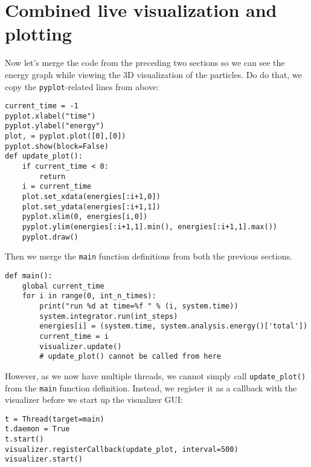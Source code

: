 \documentclass[
paper=a4,                       %
fontsize=11pt,                  %
twoside,                        %
footsepline,                    %
headsepline,                    %
headinclude=false,              %
footinclude=false,              %
pagesize,                       %
]{scrartcl}
\begin{document}
\section{Combined live visualization and plotting}

Now let's merge the code from the preceding two sections so we can see the energy graph while viewing the 3D visualization of the particles.
Do do that, we copy the \lstinline{pyplot}-related lines from above:
\begin{lstlisting}
current_time = -1
pyplot.xlabel("time")
pyplot.ylabel("energy")
plot, = pyplot.plot([0],[0])
pyplot.show(block=False)
def update_plot():
    if current_time < 0:
        return
    i = current_time
    plot.set_xdata(energies[:i+1,0])
    plot.set_ydata(energies[:i+1,1])
    pyplot.xlim(0, energies[i,0])
    pyplot.ylim(energies[:i+1,1].min(), energies[:i+1,1].max())
    pyplot.draw()
\end{lstlisting}
Then we merge the \lstinline{main} function definitions from both the previous sections.
\begin{lstlisting}
def main():
    global current_time
    for i in range(0, int_n_times):
        print("run %d at time=%f " % (i, system.time))
        system.integrator.run(int_steps)
        energies[i] = (system.time, system.analysis.energy()['total'])
        current_time = i
        visualizer.update()
        # update_plot() cannot be called from here
\end{lstlisting}
However, as we now have multiple threads, we cannot simply call \lstinline{update_plot()} from the \lstinline{main} function definition.
Instead, we register it as a callback with the visualizer before we start up the visualizer GUI:
\begin{lstlisting}
t = Thread(target=main)
t.daemon = True
t.start()
visualizer.registerCallback(update_plot, interval=500)
visualizer.start()
\end{lstlisting}
\end{document}
